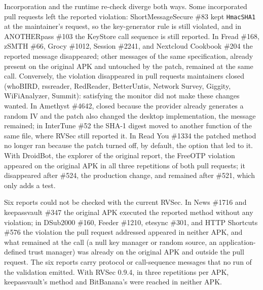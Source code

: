 \documentclass[conference]{IEEEtran}
\begin{document}
Incorporation and the runtime re-check diverge both ways. Some incorporated
pull requests left the reported violation: ShortMessageSecure \#83 kept \texttt{HmacSHA1} at the maintainer's request, so
the key-generator rule is still violated, and in ANOTHERpass \#103 the KeyStore
call sequence is still reported. In Fread \#168, zSMTH \#66, Grocy \#1012,
Session \#2241, and Nextcloud Cookbook \#204 the reported message
disappeared; other messages of the same specification, already present on the
original APK and untouched by the patch, remained at the same call.
Conversely, the violation disappeared in pull requests maintainers closed
(whoBIRD, rssreader, RedReader, BetterUntis, Network Survey, Giggity,
WiFiAnalyzer, Summit): satisfying the monitor did not make these changes
wanted. In Amethyst \#4642, closed because the provider already generates a
random IV and the patch also changed the desktop implementation, the message
remained; in InterTune \#52 the SHA-1 digest moved to another function of the
same file, where RVSec still reported it. In Read You \#1334 the patched
method no longer ran because the patch turned off, by default, the option that
led to it.
With DroidBot, the explorer of the original report, the FreeOTP violation
appeared on the original APK in all three repetitions of both pull requests;
it disappeared after \#524, the production change, and remained after \#521,
which only adds a test.

Six reports could not be checked with the current RVSec. In News \#1716 and
keepassvault \#347 the original APK executed the reported method without any
violation; in DSub2000 \#160, Feeder \#1210, etesync \#301, and HTTP Shortcuts
\#576 the violation the pull request addressed appeared in neither APK, and
what remained at the call (a null key manager or random source, an
application-defined trust manager) was already on the original APK and outside
the pull request. The six reports carry protocol or call-sequence messages that
no run of the validation emitted. With RVSec 0.9.4, in three repetitions per
APK, keepassvault's method and BitBanana's were reached in neither APK.
\end{document}
